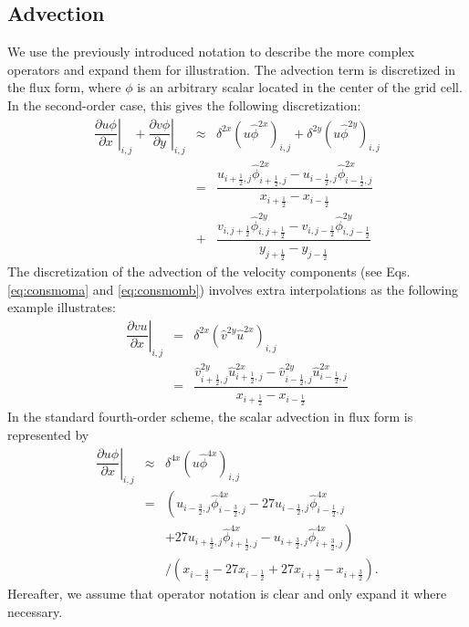 \documentclass[gmd]{copernicus}
\begin{document}
\subsection{Advection}
We use the previously introduced notation to describe the more complex operators and expand them for illustration. The advection term is discretized in the flux form, where $\phi$ is an arbitrary scalar located in the center of the grid cell. In the second-order case, this gives the following discretization:
\begin{eqnarray}
\nonumber
\left. \dfrac{\partial u \phi}{\partial x}\right|_{i,j} + \left. \dfrac{\partial v \phi}{\partial y} \right|_{i,j} & \approx & 
\delta^{2x} \left( u \widehat{\phi}^{2x} \right)_{i,j} + \delta^{2y} \left( u \widehat{\phi}^{2y} \right)_{i,j} \\ 
& = & \dfrac{ u_{i+\frac{1}{2},j} \widehat{\phi}^{2x}_{i+\frac{1}{2},j} - u_{i-\frac{1}{2},j} \widehat{\phi}^{2x}_{i-\frac{1}{2},j} }
            { x_{i+\frac{1}{2}} - x_{i-\frac{1}{2}} }\\
& + & \dfrac{ v_{i,j+\frac{1}{2}} \widehat{\phi}^{2y}_{i,j+\frac{1}{2}} - v_{i,j-\frac{1}{2}} \widehat{\phi}^{2y}_{i,j-\frac{1}{2}} }
            { y_{j+\frac{1}{2}} - y_{j-\frac{1}{2}} }
\end{eqnarray}
The discretization of the advection of the velocity components (see Eqs. \ref{eq:consmoma} and \ref{eq:consmomb}) involves extra interpolations as the following example illustrates:
\begin{eqnarray}
\left. \dfrac{\partial v u}{\partial x} \right|_{i,j} & = & \delta^{2x} \left( \widehat{v}^{2y} \widehat{u}^{2x} \right)_{i,j} \\
& = & \dfrac{ \widehat{v}^{2y}_{i+\frac{1}{2},j} \widehat{u}^{2x}_{i+\frac{1}{2},j} - \widehat{v}^{2y}_{i-\frac{1}{2},j} \widehat{u}^{2x}_{i-\frac{1}{2},j} }
      { x_{i+\frac{1}{2}} - x_{i-\frac{1}{2}} }\label{eq:advec2u}
\end{eqnarray}
In the standard fourth-order scheme, the scalar advection in flux form is represented by
\begin{eqnarray}
\nonumber
\left. \dfrac{\partial u \phi}{\partial x} \right|_{i,j} & \approx & \delta^{4x} \left( u \widehat{\phi}^{4x} \right)_{i,j} \\
\nonumber
& = & \left( u_{i-\frac{3}{2},j} \widehat{\phi}^{4x}_{i-\frac{3}{2},j} - 27 u_{i-\frac{1}{2},j} \widehat{\phi}^{4x}_{i-\frac{1}{2},j} \right.\\
\nonumber
&   &\left. + 27 u_{i+\frac{1}{2},j} \widehat{\phi}^{4x}_{i+\frac{1}{2},j} - u_{i+\frac{3}{2},j} \widehat{\phi}^{4x}_{i+\frac{3}{2},j} \right)\\
&   &\slash \left( x_{i-\frac{3}{2}} - 27 x_{i-\frac{1}{2}} + 27 x_{i+\frac{1}{2}} - x_{i+\frac{3}{2}} \right).
\end{eqnarray}
Hereafter, we assume that operator notation is clear and only expand it where necessary.
\end{document}
